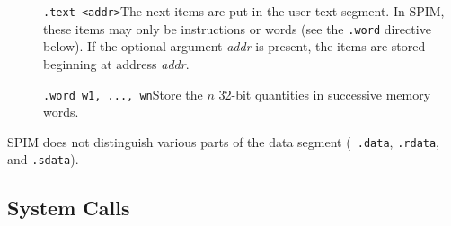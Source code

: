 \documentclass[11pt]{article}
\begin{document}
\begin{description}
  \item [] {\tt .text <addr>}\newline The next items are put in the
user text segment.  In SPIM, these items may only be instructions or
words (see the {\tt .word} directive below).  If the optional argument
{\em addr\/} is present, the items are stored beginning at address
{\em addr\/}.

  \item [] {\tt .word w1, ..., wn}\newline Store the $n$ 32-bit
quantities in successive memory words.
\end{description}
SPIM does not distinguish various parts of the data segment ({\tt
.data}, {\tt .rdata}, and {\tt .sdata}).

\subsection{System Calls}
\label{sec:scall}
\end{document}
